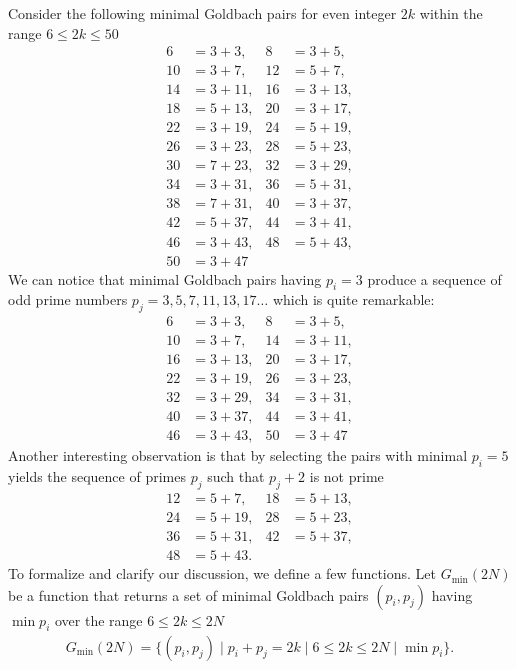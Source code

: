 Consider the following minimal Goldbach pairs for even integer $2k$ within the range $6 \leq 2k \leq 50$
\begin{align*}
    6  &= 3 + 3,   & 8  &= 3 + 5,   \\
    10 &= 3 + 7,   & 12 &= 5 + 7,   \\
    14 &= 3 + 11,  & 16 &= 3 + 13,  \\
    18 &= 5 + 13,  & 20 &= 3 + 17,  \\
    22 &= 3 + 19,  & 24 &= 5 + 19,  \\
    26 &= 3 + 23,  & 28 &= 5 + 23,  \\
    30 &= 7 + 23,  & 32 &= 3 + 29,  \\
    34 &= 3 + 31,  & 36 &= 5 + 31,  \\
    38 &= 7 + 31,  & 40 &= 3 + 37,  \\
    42 &= 5 + 37,  & 44 &= 3 + 41,  \\
    46 &= 3 + 43,  & 48 &= 5 + 43,  \\
    50 &= 3 + 47
\end{align*}
We can notice that minimal Goldbach pairs having $p_i=3$ produce a sequence of odd prime numbers
$p_j = 3, 5, 7, 11, 13, 17 \dots$ which is quite remarkable:
\begin{align*}
    6  &= 3 + 3,   & 8  &= 3 + 5,   \\
    10 &= 3 + 7,   & 14 &= 3 + 11,  \\
    16 &= 3 + 13,  & 20 &= 3 + 17,  \\
    22 &= 3 + 19,  & 26 &= 3 + 23,  \\
    32 &= 3 + 29,  & 34 &= 3 + 31,  \\
    40 &= 3 + 37,  & 44 &= 3 + 41,  \\
    46 &= 3 + 43,  & 50 &= 3 + 47
\end{align*}
Another interesting observation is that by selecting the pairs with minimal $p_i=5$ yields
the sequence of primes $p_j$ such that $p_j+2$ is not prime
\begin{align*}
    12 &= 5 + 7,   & 18 &= 5 + 13,  \\
    24 &= 5 + 19,  & 28 &= 5 + 23,  \\
    36 &= 5 + 31,  & 42 &= 5 + 37,  \\
    48 &= 5 + 43.
\end{align*}
To formalize and clarify our discussion, we define a few functions.
Let $G_{\min} (2N)$ be a function that returns a set of minimal Goldbach pairs $(p_i, p_j)$ having $\min p_i$
over the range $6 \leq 2k \leq 2N$
\begin{align*}
    G_{\min} (2N) = \{(p_i, p_j) \mid p_i + p_j = 2k \mid 6 \leq 2k \leq 2N \mid \min p_i \}.
\end{align*}

